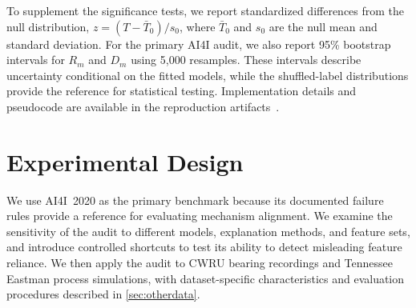 \documentclass[conference]{IEEEtran}
\begin{document}
To supplement the significance tests, we report standardized differences from the null distribution, $z=(T-\bar{T}_0)/s_0$, where $\bar{T}_0$ and $s_0$ are the null mean and standard deviation. For the primary AI4I audit, we also report 95\% bootstrap intervals for $R_m$ and $D_m$ using 5{,}000 resamples. These intervals describe uncertainty conditional on the fitted models, while the shuffled-label distributions provide the reference for statistical testing. Implementation details and pseudocode are available in the reproduction artifacts~\cite{artifact}.





\section{Experimental Design}
\label{sec:setup}


We use AI4I~2020 as the primary benchmark because its documented failure rules provide a reference for evaluating mechanism alignment. We examine the sensitivity of the audit to different models, explanation methods, and feature sets, and introduce controlled shortcuts to test its ability to detect misleading feature reliance. We then apply the audit to CWRU bearing recordings and Tennessee Eastman process simulations, with dataset-specific characteristics and evaluation procedures described in \cref{sec:otherdata}.

\end{document}
